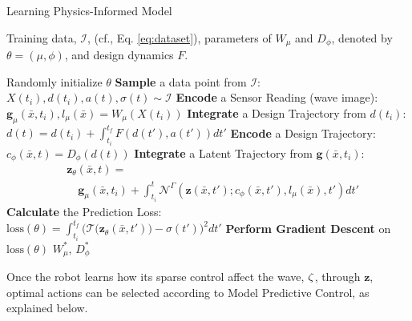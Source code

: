 \begin{algorithm}[h!]
\caption{Learning Physics-Informed Model}
\begin{algorithmic}[1]\label{alg:cPILS_NI}

\REQUIRE Training data, $\mathcal{I}$, (cf., Eq. \eqref{eq:dataset}), parameters of $W_{\mu}$ and $D_{\phi}$, denoted by $\theta = (\mu, \phi)$, and design dynamics $F$.

\STATE Randomly initialize $\theta$
\REPEAT
    \setlength\itemsep{0.5em}
    \STATE \textbf{Sample} a data point from $\mathcal{I}$:\hfill{}
    $X(t_i), d(t_i), a(t), \sigma(t)\sim \mathcal{I}$
    \STATE \textbf{Encode} a Sensor Reading (wave image):\hfill{}
    $\mathbf{g}_{\mu}(\bar{x}, t_i), l_{\mu}(\bar{x}) = W_{\mu}(X(t_i))$
    \STATE \textbf{Integrate} a Design Trajectory from $d(t_i)$:\\
    $d(t) = d(t_i) + \int_{t_i}^{t_f}F(d(t'), a(t'))dt'$
    \STATE \textbf{Encode} a Design Trajectory:\hfill{}
    $c_\phi(\bar{x}, t) = D_\phi(d(t))$
    \STATE \textbf{Integrate} a Latent Trajectory from $\mathbf{g}(\bar{x}, t_i)$:\vspace{-0.5cm}\\
    \begin{align*}
        &\mathbf{z}_{\theta}(\bar{x}, t) = \\
        &\quad\mathbf{g}_{\mu}(\bar{x}, t_i)+ \int_{t_i}^{t} \mathcal{N}^{\Gamma}(\mathbf{z}(\bar{x}, t'); c_{\phi}(\bar{x}, t'), l_{\mu}(\bar{x}), t')dt'
    \end{align*}
    \vspace{-0.5cm}
    \STATE \textbf{Calculate} the Prediction Loss:\hfill{}\\
    $\mbox{loss}(\theta) = \int_{t_i}^{t_f} \bigl(\mathcal{T}\bigl(\mathbf{z}_{\theta}(\bar{x}, t')\bigr) - \sigma(t') \bigr)^2dt'$
    \STATE \textbf{Perform Gradient Descent} on  $\mbox{loss}(\theta)$
\RETURN $W^*_{\mu}$, $D^*_{\phi}$
\end{algorithmic}
\end{algorithm}
Once the robot learns how its sparse control affect the wave, $\zeta$, through $\mathbf{z}$, optimal actions can be selected according to Model Predictive Control, as explained below.


